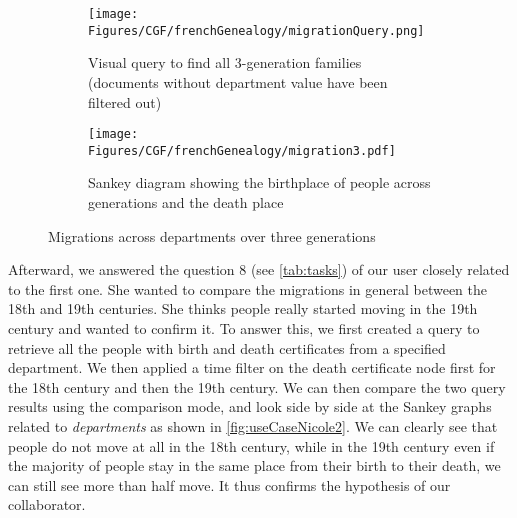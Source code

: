 \begin{figure}
    \centering

    \begin{subfigure}{0.49\linewidth}
        \texttt{[image: Figures/CGF/frenchGenealogy/migrationQuery.png]}
        \caption{Visual query to find all 3-generation families (documents without department value have been filtered out)}
        \label{fig:UseCaseNicoleQ}
    \end{subfigure}
    \begin{subfigure}{0.49\linewidth}
        \texttt{[image: Figures/CGF/frenchGenealogy/migration3.pdf]}
        \caption{Sankey diagram showing the birthplace of people across generations and the death place}
        \label{fig:UseCaseNicoleS}
    \end{subfigure}

    \caption{Migrations across departments over three generations}  \label{fig:useCaseNicole}
\end{figure}

Afterward, we answered the question 8 (see \autoref{tab:tasks}) of our user closely related to the first one. She wanted to compare the migrations in general between the 18th and 19th centuries. She thinks people really started moving in the 19th century and wanted to confirm it. To answer this, we first created a query to retrieve all the people with birth and death certificates from a specified department. We then applied a time filter on the death certificate node first for the 18th century and then the 19th century. We can then compare the two query results using the comparison mode, and look side by side at the Sankey graphs related to \textit{departments} as shown in \autoref{fig:useCaseNicole2}. We can clearly see that people do not move at all in the 18th century, while in the 19th century even if the majority of people stay in the same place from their birth to their death, we can still see more than half move. It thus confirms the hypothesis of our collaborator.

